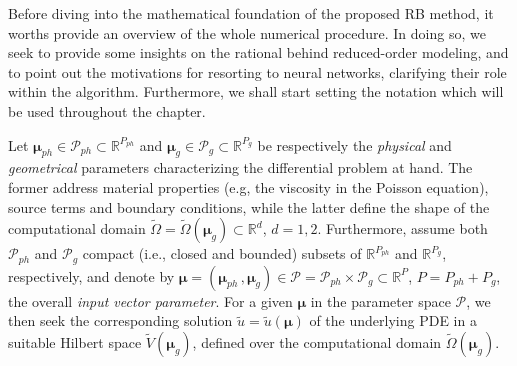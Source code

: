 \documentclass[12pt, a4paper, twoside, openright]{report}
\numberwithin{equation}{chapter}
\theoremstyle{theorem}
\theoremstyle{definition}
\theoremstyle{remark}
\theoremstyle{proposition}
\numberwithin{figure}{chapter}
\newcommand{\wt}[1]{\widetilde{#1}}
\begin{document}
		Before diving into the mathematical foundation of the proposed RB method, it worths provide an overview of the whole numerical procedure. In doing so, we seek to provide some insights on the rational behind reduced-order modeling, and to point out the motivations for resorting to neural networks, clarifying their role within the algorithm. Furthermore, we shall start setting the notation which will be used throughout the chapter.
		
		Let $\boldsymbol{\mu}_{ph} \in \mathcal{P}_{ph} \subset \mathbb{R}^{P_{ph}}$ and $\boldsymbol{\mu}_{g} \in \mathcal{P}_{g} \subset \mathbb{R}^{P_{g}}$ be respectively the \emph{physical} and \emph{geometrical} parameters characterizing the differential problem at hand. The former address material properties (e.g, the viscosity in the Poisson equation), source terms and boundary conditions, while the latter define the shape of the computational domain $\wt{\Omega} = \wt{\Omega}(\boldsymbol{\mu}_g) \subset \mathbb{R}^d$, $d = 1,2$. Furthermore, assume both $\mathcal{P}_{ph}$ and $\mathcal{P}_g$ compact (i.e., closed and bounded) subsets of  $\mathbb{R}^{P_{ph}}$ and $\mathbb{R}^{P_{g}}$, respectively, and denote by $\boldsymbol{\mu} = (\boldsymbol{\mu}_{ph} \, , \boldsymbol{\mu}_{g}) \in \mathcal{P} = \mathcal{P}_{ph} \times \mathcal{P}_g \subset \mathbb{R}^P$, $P = P_{ph} + P_g$, the overall \emph{input vector parameter}. For a given $\boldsymbol{\mu}$ in the parameter space $\mathcal{P}$, we then seek the corresponding solution $\wt{u} = \wt{u}(\boldsymbol{\mu})$ of the underlying PDE in a suitable Hilbert space $\wt{V}(\boldsymbol{\mu}_g)$, defined over the computational domain $\wt{\Omega}(\boldsymbol{\mu}_g)$. 
		
\end{document}
